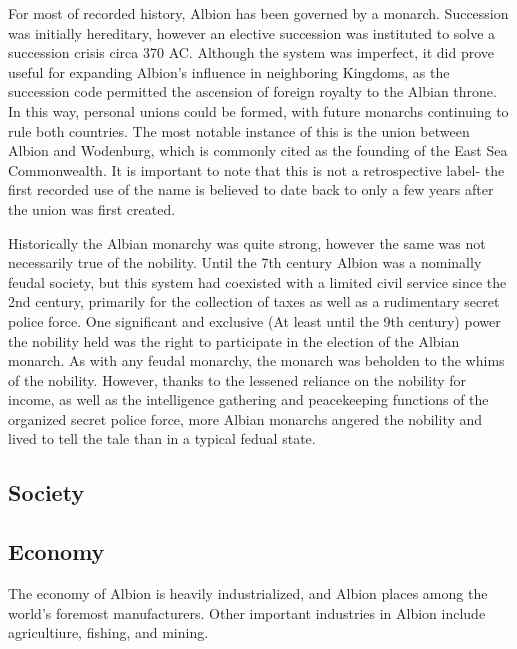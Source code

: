 	For most of recorded history, Albion has been governed by a monarch.  Succession was initially hereditary, however an elective succession was instituted to solve a succession crisis circa 370 AC.  Although the system was imperfect, it did prove useful for expanding Albion's influence in neighboring Kingdoms, as the succession code permitted the ascension of foreign royalty to the Albian throne.  In this way, personal unions could be formed, with future monarchs continuing to rule both countries.  The most notable instance of this is the union between Albion and Wodenburg, which is commonly cited as the founding of the East Sea Commonwealth.  It is important to note that this is not a retrospective label- the first recorded use of the name is believed to date back to only a few years after the union was first created.
	
	Historically the Albian monarchy was quite strong, however the same was not necessarily true of the nobility.  Until the 7th century Albion was a nominally feudal society, but this system had  coexisted with a limited civil service since the 2nd century, primarily for the collection of taxes as well as a rudimentary secret police force.  One significant and exclusive (At least until the 9th century) power the nobility held was the right to participate in the election of the Albian monarch.  As with any feudal monarchy, the monarch was beholden to the whims of the nobility.  However, thanks to the lessened reliance on the nobility for income, as well as the intelligence gathering and peacekeeping functions of the organized secret police force, more Albian monarchs angered the nobility and lived to tell the tale than in a typical fedual state.

\subsection{Society}  %

\subsection{Economy}

	The economy of Albion is heavily industrialized, and Albion places among the world's foremost manufacturers.  Other important industries in Albion include agricultiure, fishing, and mining.

